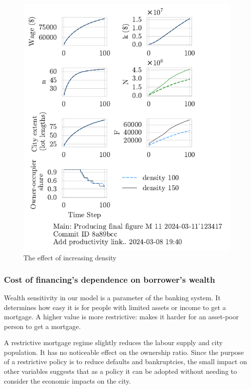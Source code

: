 \begin{figure}[h!bt]
    \centering
    \includegraphics[scale=.8, trim={0 1.4cm 0 0},clip]{fig/density-Main-123417.pdf}
    \caption{The effect of increasing density}
    \label{fig:density_ownership_trajectory}
\end{figure}


\newpage

\subsubsection{Cost of financing's dependence on borrower's wealth}
Wealth sensitivity in our model is a parameter of the banking system. It determines how easy it is for people with limited assets or income to get a mortgage. A higher value is more restrictive:  makes it harder for an asset-poor person to get a mortgage.

A restrictive mortgage regime slightly reduces the labour supply and city population. It has no noticeable effect on the ownership ratio. Since the purpose of a restrictive policy is to reduce defaults and bankruptcies, the small impact on other variables suggests that as a policy it can be adopted without needing to consider the economic impacts on the city. 

